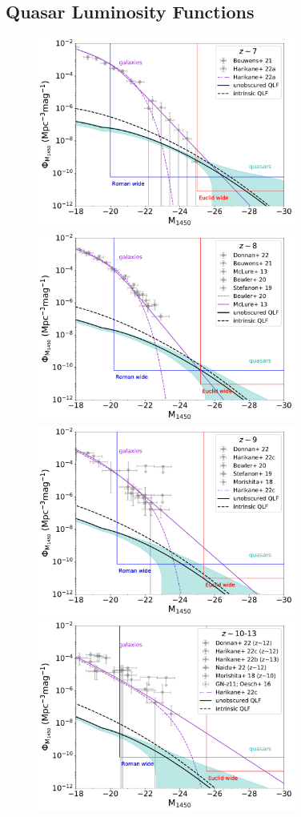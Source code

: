 \documentclass[twocolumn, twocolappendix]{aastex63}
\begin{document}
\begin{CJK*}{UTF8}{gbsn}
\subsection{Quasar Luminosity Functions}
\label{sec:qlfglf}


\begin{figure}[h!]
\centering
\includegraphics[width=85mm]{LF_spreadz7.pdf}\hspace{2mm}
\includegraphics[width=85mm]{LF_spreadz8.pdf}\\\vspace{5mm}
\includegraphics[width=85mm]{LF_spreadz9.pdf}\hspace{2mm}
\includegraphics[width=85mm]{LF_spreadz10.pdf}

\end{figure}
\end{CJK*}
\end{document}
